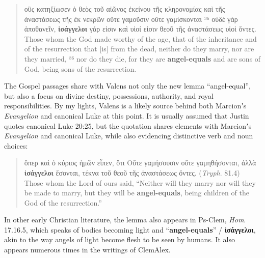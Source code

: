 \vspace*{2mm} 
 \begin{quote}οὓς κατηξίωσεν ὁ θεὸς τοῦ αἰῶνος ἐκείνου τῆς κληρονομίας %
 καὶ τῆς ἀναστάσεως τῆς ἐκ νεκρῶν οὔτε γαμοῦσιν οὔτε γαμίσκονται %
 ³⁶ οὐδὲ γὰρ ἀποθανεῖν, \textbf{ἰσάγγελοι} γάρ εἰσιν καὶ %
 υἱοί εἰσιν θεοῦ τῆς ἀναστάσεως υἱοὶ ὄντες. \\[0.25mm] %
 Those whom the God made worthy of the age, %
 that of the inheritance and of the resurrection that [is] from the dead, %
 neither do they marry, nor are they married, %
 ³⁶ nor do they die, for they are \textbf{angel-equals} and %
 are sons of God, being sons of the resurrection. %
 \end{quote} %
\clearpage

The Gospel passages share with Valens not only the new lemma “angel-equal”, %
but also a focus on divine destiny, possessions, authority, and royal responsibilities. %
By my lights, Valens is a likely source behind both Marcionʼs \textit{Evangelion} and canonical Luke at this point. %
It is usually assumed that Justin quotes canonical Luke 20:25, %
but the quotation shares elements with Marcionʼs \textit{Evangelion} and canonical Luke, %
while also evidencing distinctive verb and noun choices: %

\vspace*{2mm} 
 \begin{quote}ὅπερ καὶ ὁ κύριος ἡμῶν εἶπεν, %
 ὅτι Οὔτε γαμήσουσιν οὔτε γαμηθήσονται, %
 ἀλλὰ \textbf{ἰσάγγελοι} ἔσονται, τέκνα τοῦ θεοῦ τῆς ἀναστάσεως ὄντες. (\textit{Tryph}. 81.4) \\[1mm] %
 Those whom the Lord of ours said, %
 “Neither will they marry nor will they be made to marry, %
 but they will be \textbf{angel-equals}, being children of the God of the resurrection.”\end{quote} %
 \vspace*{2mm} %

\noindent{}In other early Christian literature, the lemma %
also appears in Ps-Clem, \textit{Hom}. 17.16.5, %
which speaks of bodies becoming light and “\textbf{angel-equals}” / \textbf{ἰσάγγελοι}, %
akin to the way angels of light become flesh to be seen by humans. %
It also appears numerous times in the writings of ClemAlex.

